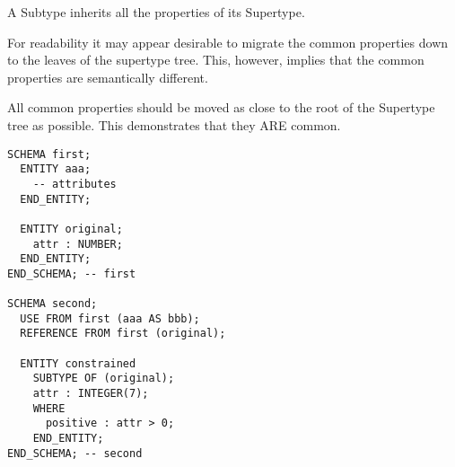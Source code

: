     A Subtype inherits all the properties of its Supertype.

    For readability it may appear desirable to migrate the common properties
down to the leaves of the supertype tree. This, however, implies that the
common properties are semantically different.

    All common properties should be moved as close to the root of the Supertype
tree as possible. This demonstrates that they ARE common.


\begin{verbatim}
SCHEMA first;
  ENTITY aaa;
    -- attributes
  END_ENTITY;

  ENTITY original;
    attr : NUMBER;
  END_ENTITY;
END_SCHEMA; -- first

SCHEMA second;
  USE FROM first (aaa AS bbb);
  REFERENCE FROM first (original);

  ENTITY constrained
    SUBTYPE OF (original);
    attr : INTEGER(7);
    WHERE
      positive : attr > 0;
    END_ENTITY;
END_SCHEMA; -- second
\end{verbatim}

\endinput


